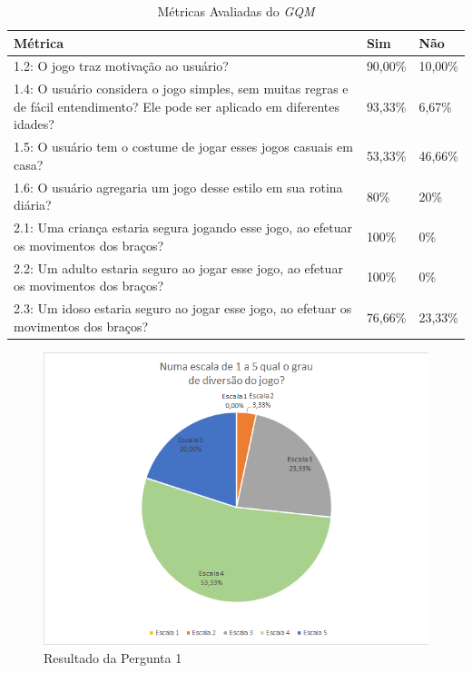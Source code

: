 \begin{table}[h]
\caption{Métricas Avaliadas do \textit{GQM}}
\centering
\begin{tabular}{|p{10cm}|p{1.2cm}|p{1.2cm}|}
\hline
\textbf{Métrica} & \textbf{Sim} & \textbf{Não} \\ \hline
1.2: O jogo traz motivação ao usuário? & 90,00\% & 10,00\% \\ \hline
1.4: O usuário considera o jogo simples, sem muitas regras e de fácil entendimento? Ele pode ser aplicado em diferentes idades? & 93,33\% & 6,67\% \\ \hline
1.5: O usuário tem o costume de jogar esses jogos casuais em casa? & 53,33\% & 46,66\% \\ \hline
1.6: O usuário agregaria um jogo desse estilo em sua rotina diária? & 80\% & 20\% \\ \hline
2.1: Uma criança estaria segura jogando esse jogo, ao efetuar os movimentos dos braços? & 100\% & 0\% \\ \hline
2.2: Um adulto estaria seguro ao jogar esse jogo, ao efetuar os movimentos dos braços? & 100\% & 0\% \\ \hline
2.3: Um idoso estaria seguro ao jogar esse jogo, ao efetuar os movimentos dos braços? & 76,66\% & 23,33\% \\ \hline
\end{tabular}
\label{table:resultados_gqm}
\end{table}


\begin{figure}[!htb]
     \centering
     \includegraphics[scale=0.8]{./img/chart_1-.png}
     \caption{Resultado da Pergunta 1}
     \label{fig:question1}
\end{figure}


